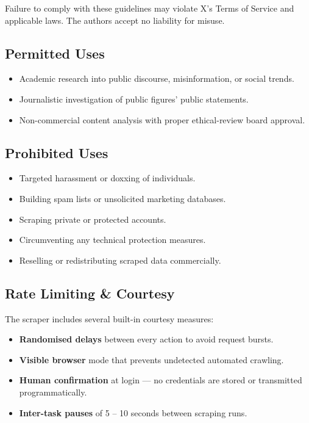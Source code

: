 \documentclass[11pt, a4paper]{article}
\newenvironment{warnbox}[1][Warning]{%
  \begin{tcolorbox}[enhanced, breakable,
    colback=TwRed!6, colframe=TwRed,
    boxrule=0.8pt, arc=5pt,
    left=8pt, right=8pt, top=5pt, bottom=5pt,
    title={\textbf{#1}},
    fonttitle=\small\color{TwRed},
    attach boxed title to top left={yshift=-2mm, xshift=8mm},
    boxed title style={colback=TwRed!6, colframe=TwRed, arc=3pt}]
}{\end{tcolorbox}}
\def\color#1{}%
\begin{document}
\begin{warnbox}[Read Before Use]
Failure to comply with these guidelines may violate X's Terms of Service
and applicable laws. The authors accept no liability for misuse.
\end{warnbox}
\newpage
\subsection{Permitted Uses}

\begin{itemize}[leftmargin=1.6em, itemsep=3pt]
  \item Academic research into public discourse, misinformation, or social trends.
  \item Journalistic investigation of public figures' public statements.
  \item Non-commercial content analysis with proper ethical-review board approval.
\end{itemize}

\subsection{Prohibited Uses}

\begin{itemize}[leftmargin=1.6em, itemsep=3pt]
  \item Targeted harassment or doxxing of individuals.
  \item Building spam lists or unsolicited marketing databases.
  \item Scraping private or protected accounts.
  \item Circumventing any technical protection measures.
  \item Reselling or redistributing scraped data commercially.
\end{itemize}

\subsection{Rate Limiting \& Courtesy}

The scraper includes several built-in courtesy measures:

\begin{itemize}[leftmargin=1.6em, itemsep=3pt]
  \item \textbf{Randomised delays} between every action to avoid request bursts.
  \item \textbf{Visible browser} mode that prevents undetected automated crawling.
  \item \textbf{Human confirmation} at login --- no credentials are stored or transmitted programmatically.
  \item \textbf{Inter-task pauses} of 5 -- 10 seconds between scraping runs.
\end{itemize}
\end{document}
